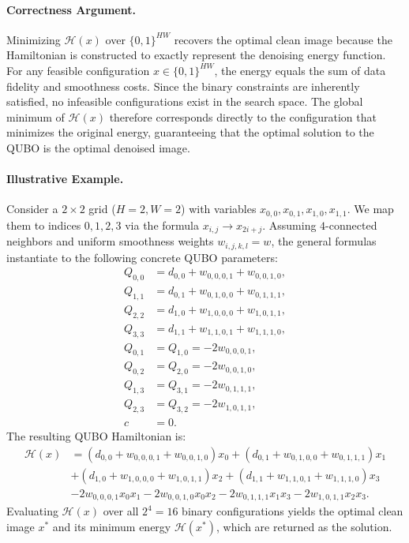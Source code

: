 \documentclass[12pt]{article}
\begin{document}
\paragraph{Correctness Argument.}
Minimizing $\mathcal{H}(x)$ over $\{0,1\}^{HW}$ recovers the optimal clean image because the Hamiltonian is constructed to exactly represent the denoising energy function. For any feasible configuration $x \in \{0,1\}^{HW}$, the energy equals the sum of data fidelity and smoothness costs. Since the binary constraints are inherently satisfied, no infeasible configurations exist in the search space. The global minimum of $\mathcal{H}(x)$ therefore corresponds directly to the configuration that minimizes the original energy, guaranteeing that the optimal solution to the QUBO is the optimal denoised image.

\paragraph{Illustrative Example.}
Consider a $2 \times 2$ grid ($H=2, W=2$) with variables $x_{0,0}, x_{0,1}, x_{1,0}, x_{1,1}$. We map them to indices $0, 1, 2, 3$ via the formula $x_{i,j} \to x_{2i+j}$. Assuming $4$-connected neighbors and uniform smoothness weights $w_{i,j,k,l} = w$, the general formulas instantiate to the following concrete QUBO parameters:
\begin{align}
Q_{0,0} &= d_{0,0} + w_{0,0,0,1} + w_{0,0,1,0}, \\
Q_{1,1} &= d_{0,1} + w_{0,1,0,0} + w_{0,1,1,1}, \\
Q_{2,2} &= d_{1,0} + w_{1,0,0,0} + w_{1,0,1,1}, \\
Q_{3,3} &= d_{1,1} + w_{1,1,0,1} + w_{1,1,1,0}, \\
Q_{0,1} &= Q_{1,0} = -2 w_{0,0,0,1}, \\
Q_{0,2} &= Q_{2,0} = -2 w_{0,0,1,0}, \\
Q_{1,3} &= Q_{3,1} = -2 w_{0,1,1,1}, \\
Q_{2,3} &= Q_{3,2} = -2 w_{1,0,1,1}, \\
c &= 0.
\end{align}
The resulting QUBO Hamiltonian is:
\begin{align}
\mathcal{H}(x) &= (d_{0,0} + w_{0,0,0,1} + w_{0,0,1,0}) x_0 + (d_{0,1} + w_{0,1,0,0} + w_{0,1,1,1}) x_1 \nonumber \\
&+ (d_{1,0} + w_{1,0,0,0} + w_{1,0,1,1}) x_2 + (d_{1,1} + w_{1,1,0,1} + w_{1,1,1,0}) x_3 \nonumber \\
&- 2 w_{0,0,0,1} x_0 x_1 - 2 w_{0,0,1,0} x_0 x_2 - 2 w_{0,1,1,1} x_1 x_3 - 2 w_{1,0,1,1} x_2 x_3.
\end{align}
Evaluating $\mathcal{H}(x)$ over all $2^4 = 16$ binary configurations yields the optimal clean image $x^*$ and its minimum energy $\mathcal{H}(x^*)$, which are returned as the solution.
\end{document}
